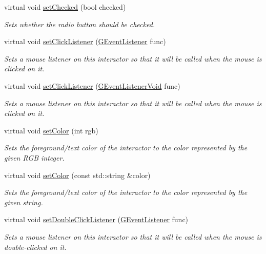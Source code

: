 \begin{DoxyCompactItemize}
virtual void \mbox{\hyperlink{classsgl_1_1GRadioButton_a116285e2f56247b00b26035ca0ac4737}{set\+Checked}} (bool checked)
\begin{DoxyCompactList}\small\item\em Sets whether the radio button should be checked. \end{DoxyCompactList}\item 
virtual void \mbox{\hyperlink{classsgl_1_1GInteractor_abd40af6921242584d0954f173911b190}{set\+Click\+Listener}} (\mbox{\hyperlink{namespacesgl_ae9f3e9eab70035da1a2b114e21357b25}{G\+Event\+Listener}} func)
\begin{DoxyCompactList}\small\item\em Sets a mouse listener on this interactor so that it will be called when the mouse is clicked on it. \end{DoxyCompactList}\item 
virtual void \mbox{\hyperlink{classsgl_1_1GInteractor_a856414c92df90f56f3877475eb3f8fc4}{set\+Click\+Listener}} (\mbox{\hyperlink{namespacesgl_a54427ce97bb1c2804e4fe2b0a62e8b17}{G\+Event\+Listener\+Void}} func)
\begin{DoxyCompactList}\small\item\em Sets a mouse listener on this interactor so that it will be called when the mouse is clicked on it. \end{DoxyCompactList}\item 
virtual void \mbox{\hyperlink{classsgl_1_1GInteractor_ab1f5cc0f5cc6bbbd716a526c61f1081d}{set\+Color}} (int rgb)
\begin{DoxyCompactList}\small\item\em Sets the foreground/text color of the interactor to the color represented by the given R\+GB integer. \end{DoxyCompactList}\item 
virtual void \mbox{\hyperlink{classsgl_1_1GInteractor_a61374df6c11b52cfbb0815decdbaebc6}{set\+Color}} (const std\+::string \&color)
\begin{DoxyCompactList}\small\item\em Sets the foreground/text color of the interactor to the color represented by the given string. \end{DoxyCompactList}\item 
virtual void \mbox{\hyperlink{classsgl_1_1GInteractor_ac29f9a3462458e165fae3a1f046ee77a}{set\+Double\+Click\+Listener}} (\mbox{\hyperlink{namespacesgl_ae9f3e9eab70035da1a2b114e21357b25}{G\+Event\+Listener}} func)
\begin{DoxyCompactList}\small\item\em Sets a mouse listener on this interactor so that it will be called when the mouse is double-\/clicked on it. \end{DoxyCompactList}\item 

\end{DoxyCompactItemize}
